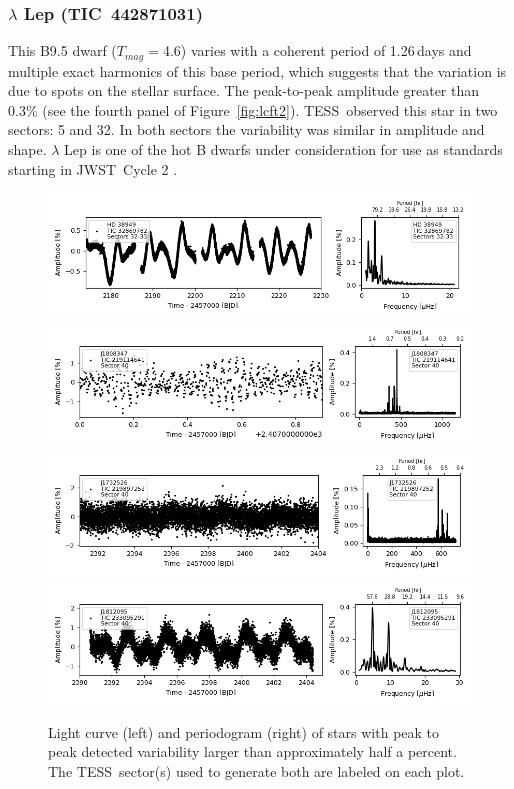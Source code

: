 \documentclass[twocolumn]{aastex631}
\newcommand{\webb}{JWST}
\newcommand{\jwst}{JWST}
\newcommand{\tess}{TESS}
\begin{document}
\subsubsection{$\lambda$ Lep (TIC~442871031)}

This B9.5 dwarf ($T_{mag}=$4.6) varies with a coherent period of 1.26\,days and multiple exact harmonics of this base period, which suggests that the variation is due to spots on the stellar surface. The peak-to-peak amplitude greater than 0.3\% (see the fourth panel of Figure~\ref{fig:lcft2}). \tess\ observed this star in two sectors: 5 and 32. In both sectors the variability was similar in amplitude and shape. $\lambda$ Lep is one of the hot B dwarfs under consideration for use as standards starting in \jwst\ Cycle 2 \citep{Gordon2022inprep}. 



\begin{figure}
    \centering
    \includegraphics[width=0.9\linewidth]{figures/tic00000032869782_s323_norm1.fits.png}
    \includegraphics[width=0.9\linewidth]{figures/tic00000219114641_s040_flat2.fits.png}
    \includegraphics[width=0.9\linewidth]{figures/tic00000219897252_s040_norm1.fits.png}
    \includegraphics[width=0.9\linewidth]{figures/tic00000233095291_s040_flat1.fits.png}
    \caption{Light curve (left) and periodogram (right) of stars with peak to peak detected variability larger than approximately half a percent. The \tess\ sector(s) used to generate both are labeled on each plot.}
    \label{fig:lcft1}
\end{figure}
\end{document}
